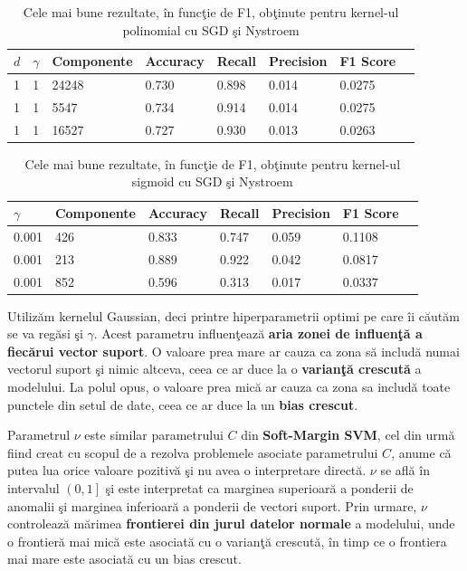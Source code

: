 \begin{table}[H]
    \centering
    \begin{tabularx}{\textwidth}{
        |X
        |X
        |l
        |X
        |X
        |X
        |X
        |X|
    }
    \hline
    $d$ & $\gamma$ & {Componente} & {Accuracy} & {Recall} & {Precision} & {F1 Score} \\
    \hline
    1 & 1 & 24248 & 0.730 & 0.898 & 0.014 & 0.0275 \\
    \rowcolor{gray!20} 1 &  1 & 5547 & 0.734	& 0.914	& 0.014	& 0.0275 \\ 
    1 & 1 & 16527 & 0.727 & 0.930 & 0.013 & 0.0263 \\ 
    \hline
  \end{tabularx}
  \caption{Cele mai bune rezultate, în funcţie de F1, obţinute pentru kernel-ul polinomial cu SGD şi Nystroem}
\end{table}

\begin{table}[H]
    \centering
    \begin{tabularx}{\textwidth}{
        |X
        |X
        |X
        |X
        |X
        |X
        |X|
    }
    \hline
    $\gamma$ & {Componente} & {Accuracy} & {Recall} & {Precision} & {F1 Score} \\
    \hline
     0.001 & 426 & 0.833 & 0.747 & 0.059 & 0.1108 \\
     \rowcolor{gray!20} 0.001 & 213 & 0.889 & 0.922 & 0.042	& 0.0817 \\
    0.001 & 852	& 0.596 & 0.313 & 0.017	& 0.0337 \\
    \hline
  \end{tabularx}
  \caption{Cele mai bune rezultate, în funcţie de F1, obţinute pentru kernel-ul sigmoid cu SGD şi Nystroem}
\end{table}

Utilizăm kernelul Gaussian, deci printre hiperparametrii optimi pe care îi căutăm 
se va regăsi şi $\gamma$. Acest parametru influenţează 
\textbf{aria zonei de influenţă a 
fiecărui vector suport}. O valoare prea mare ar cauza ca zona să includă numai 
vectorul suport şi nimic altceva, ceea ce ar duce la o \textbf{varianţă crescută} 
a modelului. La polul opus, o valoare prea mică ar cauza ca zona sa includă 
toate punctele din setul de date, ceea ce ar duce la un \textbf{bias crescut}.

Parametrul $\nu$ este similar parametrului $C$ din \textbf{Soft-Margin SVM}, 
cel din urmă
fiind creat cu scopul de a rezolva problemele asociate parametrului $C$, anume că 
putea lua orice valoare pozitivă şi nu avea o interpretare directă. $\nu$ se află 
în intervalul $\left(0, 1\right]$ şi este interpretat ca marginea superioară a ponderii de anomalii 
şi marginea inferioară a ponderii de vectori suport. Prin urmare, $\nu$ controlează
mărimea \textbf{frontierei din jurul datelor normale} a modelului, 
unde o frontieră mai mică este asociată
cu o varianţă crescută, în timp ce o frontiera mai mare este asociată cu un bias 
crescut.

